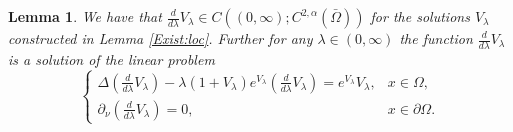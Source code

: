\documentclass[12pt,a4paper]{amsart}
\newtheorem{lemma}[theorem]{Lemma}
\theoremstyle{definition}
\theoremstyle{remark}
\numberwithin{equation}{section}
\numberwithin{theorem}{section}
\begin{document}
\begin{lemma}\label{V:dif:lem}
We have that $\frac{d}{d\lambda}V_{\lambda}\in C((0,\infty); C^{2,\alpha}(\bar{\Omega}))$ for the solutions $V_\lambda$ constructed in Lemma \ref{Exist:loc}. Further for any $\lambda\in(0,\infty)$ the function $\frac{d}{d\lambda}V_{\lambda}$ is a solution of the linear problem
\begin{equation}\label{V:lam:der}
\left\{\begin{array}{lr}
\Delta \left(\frac{d}{d\lambda}V_{\lambda}\right)-\lambda(1+V_\lambda)e^{V_\lambda}\left(\frac{d}{d\lambda}V_{\lambda}\right)=e^{V_\lambda}V_\lambda,& x\in\Omega,\\
\partial_\nu \left(\frac{d}{d\lambda}V_{\lambda}\right)=0,& x\in\partial\Omega. 
\end{array}\right.
\end{equation}
\end{lemma}
\end{document}
